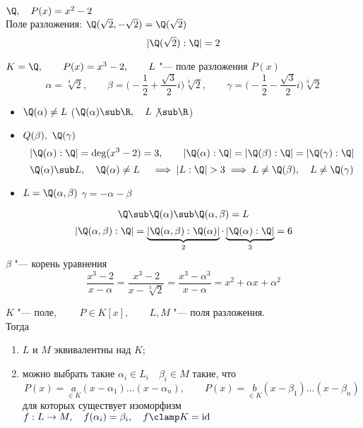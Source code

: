 \begin{exmpls}
	\item $ \Q, \quad P(x) = x^2 - 2 $ \\
	Поле разложения: $ \Q(\sqrt2, -\sqrt2) = \Q(\sqrt2) $
	$$ |\Q(\sqrt2) : \Q | = 2 $$
	\item $ K = \Q, \qquad P(x) = x^3 - 2, \qquad L $ "--- поле разложения $ P(x) $
	$$ \alpha = \sqrt[3]2, \qquad \beta = \bigg( -\frac12 + \frac{\sqrt3}2i \bigg)\sqrt[3]2, \qquad \gamma = \bigg( -\frac12 - \frac{\sqrt3}2i \bigg) \sqrt[3]2 $$
	\begin{itemize}
		\item $ \Q(\alpha) \ne L $ (\as $ \Q(\alpha) \sub \R, \quad L \not\sub \R $)
		\item $ Q(\beta), ~ \Q(\gamma) $
		$$ |\Q(\alpha) : \Q| = \deg (x^3 - 2) = 3, \qquad |\Q(\alpha) : \Q| = |\Q(\beta) : \Q| = |\Q(\gamma) : \Q| $$
		$$ \Q(\alpha) \sub L, \quad \Q(\alpha) \ne L \quad \implies |L : \Q| > 3 \implies L \ne \Q(\beta), \quad L \ne \Q(\gamma) $$
		\item $ L = \Q(\alpha, \beta) $ \as $ \gamma = -\alpha - \beta $
	\end{itemize}
	$$ \Q \sub \Q(\alpha) \sub \Q(\alpha, \beta) = L $$
	$$ |\Q(\alpha, \beta) : \Q| = \underbrace{|\Q(\alpha, \beta) : \Q(\alpha)|}_2 \cdot \underbrace{|\Q(\alpha) : \Q|}_3 = 6 $$
	$ \beta $ "--- корень уравнения
	$$ \frac{x^3 - 2}{x - \alpha} = \frac{x^3 - 2}{x - \sqrt[3]2} = \frac{x^3 - \alpha^3}{x - \alpha} = x^2 + \alpha x + \alpha^2 $$
\end{exmpls}

\begin{theorem}
	$ K $ "--- поле, $ \qquad P \in K[x], \qquad L, M $ "--- поля разложения. \\
	Тогда
	\begin{enumerate}
		\item $ L $ и $ M $ эквивалентны над $ K $;
		\item можно выбрать такие $ \alpha_i \in L_i \quad \beta_i \in M $ такие, что
		$$ P(x) = \underset{\in K}a(x - \alpha_1)\dots (x - \alpha_n), \qquad P(x) = \underset{\in K}b(x - \beta_1)\dots(x - \beta_n) $$
		для которых существует изоморфизм $ f : L \to M, \quad f(\alpha_i) = \beta_i, \quad f\clamp K = \operatorname{id} $
	\end{enumerate}
\end{theorem}

